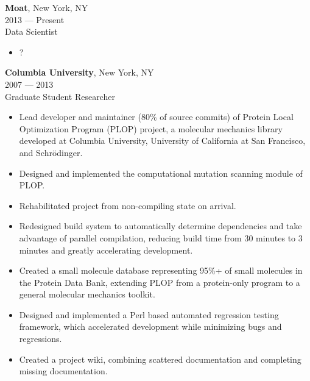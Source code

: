\textbf{Moat}, New York, NY\\
2013 --- Present\\
Data Scientist\\
\begin{itemize}[topsep=1ex, partopsep=0ex, parsep=0ex, itemsep=0.5ex]
    \item ?
\end{itemize}
\vspace{\mybigskip}

\textbf{Columbia University}, New York, NY\\
2007 --- 2013\\
Graduate Student Researcher\\
\begin{itemize}[topsep=1ex, partopsep=0ex, parsep=0ex, itemsep=0.5ex]
    \item Lead developer and maintainer ({\mytilde}80\% of source commits) of Protein Local Optimization Program (PLOP) project, a molecular mechanics library developed at Columbia University, University of California at San Francisco, and Schr\"{o}dinger.
    \item Designed and implemented the computational mutation scanning module of PLOP.
    \item Rehabilitated project from non-compiling state on arrival.
    \item Redesigned build system to automatically determine dependencies and take advantage of parallel compilation, reducing build time from {\mytilde}30 minutes to {\mytilde}3 minutes and greatly accelerating development.
    \item Created a small molecule database representing 95\%+ of small molecules in the Protein Data Bank, extending PLOP from a protein-only program to a general molecular mechanics toolkit.
    \item Designed and implemented a Perl based automated regression testing framework, which accelerated development while minimizing bugs and regressions.
    \item Created a project wiki, combining scattered documentation and completing missing documentation.
\end{itemize}
\vspace{\mybigskip}

